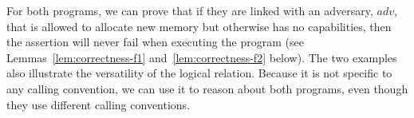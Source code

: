 \documentclass[compsoc,conference,letterpaper,fleqn]{IEEEtran}
\newcommand\lau[1]{{\color{purple} \sf \footnotesize {LS: #1}}\\}
\newcommand\lars[1]{{\color{purple} \sf \footnotesize {LB: #1}}\\}
\newcommand{\var}[1]{\mathit{#1}}
\newcommand{\adv}{\var{adv}}
\begin{document}
For both programs, we can prove that if they are linked with an
adversary, $\adv$, that is allowed to allocate new memory but
otherwise has no capabilities, then the assertion will never fail when
executing the program (see Lemmas~\ref{lem:correctness-f1}
and~\ref{lem:correctness-f2} below).
The two examples also illustrate the versatility of the logical relation.
Because it is not specific to any calling convention, we can use it to reason
about both programs, even though they use different calling conventions.
\end{document}
